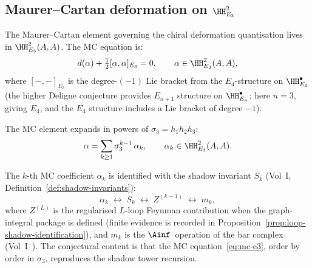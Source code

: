\subsection{Maurer--Cartan deformation on \texorpdfstring{$\HH^2_{E_3}$}{HH-2-E-3}}
\label{subsec:mc-hh-e3}

The Maurer--Cartan element governing the chiral deformation quantisation lives in $\HH^2_{E_3}(A, A)$. The MC equation is:
\begin{equation}\label{eq:mc-e3}
 d(\alpha) + \tfrac{1}{2}[\alpha, \alpha]_{E_3} = 0,
 \qquad \alpha \in \HH^2_{E_3}(A, A),
\end{equation}
where $[-, -]_{E_3}$ is the degree-$(-1)$ Lie bracket from the $E_4$-structure on $\HH^\bullet_{E_3}$ (the higher Deligne conjecture provides $E_{n+1}$ structure on $\HH^\bullet_{E_n}$; here $n = 3$, giving $E_4$, and the $E_4$ structure includes a Lie bracket of degree $-1$).

The MC element expands in powers of $\sigma_3 = h_1 h_2 h_3$:
\begin{equation}\label{eq:mc-expansion}
 \alpha = \sum_{k \geq 1} \sigma_3^{k-1}\, \alpha_k,
 \qquad
 \alpha_k \in \HH^2_{E_3}(A, A).
\end{equation}

\begin{conjecture}[MC element = shadow tower]
\label{conj:mc-shadow-tower}
\ClaimStatusConjectured
The $k$-th MC coefficient $\alpha_k$ is identified with the shadow invariant $S_k$ (Vol~I, Definition~\ref{def:shadow-invariants}):
\begin{equation}\label{eq:mc-shadow-identification}
 \alpha_k \;\longleftrightarrow\; S_k \;\longleftrightarrow\; Z^{(k-1)} \;\longleftrightarrow\; m_k,
\end{equation}
where $Z^{(L)}$ is the regularised $L$-loop Feynman contribution when
the graph-integral package is defined (finite evidence is recorded in
Proposition~\ref{prop:loop-shadow-identification}), and $m_k$ is the
$\Ainf$~operation of the bar complex (Vol~I~\cite{VolI}). The conjectural content is that the MC equation~\eqref{eq:mc-e3}, order by order in $\sigma_3$, reproduces the shadow tower recursion.
\end{conjecture}


